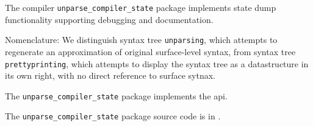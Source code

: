 
The compiler {\tt unparse\_compiler\_state} package implements state dump functionality 
supporting debugging and documentation.

Nomenclature:  We distinguish syntax tree {\tt unparsing}, which attempts to regenerate an approximation 
of original surface-level syntax, from syntax tree {\tt prettyprinting}, which attempts to display 
the syntax tree as a datastructure in its own right, with no direct reference to surface sytnax.

The {\tt unparse\_compiler\_state} package implements the  api.

The {\tt unparse\_compiler\_state} package source code is in .


